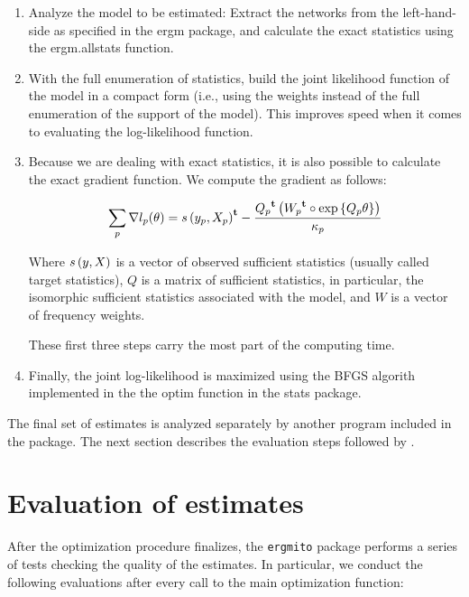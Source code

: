 \documentclass[12pt]{article}
\begin{document}
\begin{enumerate}
    \item Analyze the model to be estimated: Extract the networks from the left-hand-side as specified in the ergm package, and calculate the exact statistics using the ergm.allstats function.
    \item With the full enumeration of statistics, build the joint likelihood function of the model in a compact form (i.e., using the weights instead of the full enumeration of the support of the model). This improves speed when it comes to evaluating the log-likelihood function.
    \item Because we are dealing with exact statistics, it is also possible to calculate the exact gradient function. We compute the gradient as follows:
    
    \begin{equation}
    \sum_{p}\nabla l_p(\theta) = {s\left(y_p, X_p\right)}^\mathbf{t} - \frac{{Q_p}^\mathbf{t}\left({W_p}^\mathbf{t} \circ \mbox{exp}\left\{Q_p \theta\right\}\right)}{\kappa_p}
    \end{equation}
    
    Where $s\left(y, X\right)$ is a vector of observed sufficient statistics (usually called target statistics), $Q$ is a matrix of sufficient statistics, in particular, the isomorphic sufficient statistics associated with the model, and $W$ is a vector of frequency weights.
    
    These first three steps carry the most part of the computing time.
    
    \item Finally, the joint log-likelihood is maximized using the BFGS algorith implemented in the the optim function in the stats package.
    
\end{enumerate}

The final set of estimates is analyzed separately by another program included in the package. The next section describes the evaluation steps followed by \ergmito{}.

\section{\label{sec:evaluation-of-estimates}Evaluation of estimates}

After the optimization procedure finalizes, the \texttt{ergmito} package performs a series of tests checking the quality of the estimates. In particular, we conduct the following evaluations after every call to the main optimization function:
\end{document}
